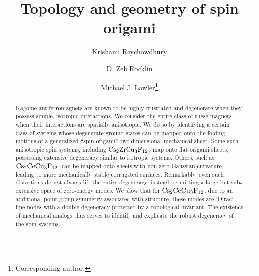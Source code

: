 \documentclass[a4paper,aps,prl,twocolumn,floatfix,showpacs,superscriptaddress]{revtex4-1}
\begin{document}
\title{Topology and geometry of spin origami}

\author{Krishanu Roychowdhury}
\author{D. Zeb Rocklin}
\author{Michael J. Lawler\footnote{Corresponding author.}}


\begin{abstract}
Kagome antiferromagnets are known to be highly frustrated and degenerate when they possess simple, isotropic interactions.
 We consider the entire class of these magnets when their interactions are spatially anisotropic.
We do so by identifying a certain class of systems whose degenerate ground states can be mapped onto the folding motions of a generalized ``spin origami'' two-dimensional mechanical sheet.
Some such anisotropic spin systems, including ${\rm Cs}_2{\rm ZrCu}_3{\rm F}_{12}$, map onto flat origami sheets, possessing extensive degeneracy similar to isotropic systems. Others, such as ${\rm Cs}_2{\rm CeCu}_3{\rm F}_{12}$, can be mapped onto sheets with non-zero Gaussian curvature, leading to more mechanically stable corrugated surfaces. 
Remarkably, even such distortions do not always lift the entire degeneracy, instead permitting a large but sub-extensive space of zero-energy modes.
We show that for ${\rm Cs}_2{\rm CeCu}_3{\rm F}_{12}$, due to an additional point group symmetry associated with structure, these modes are 'Dirac' line nodes with a double degeneracy protected by a topological invariant. 
The existence of mechanical analogs thus serves to identify and explicate the robust degeneracy of the spin systems. 
\end{abstract}

\maketitle
\end{document}
